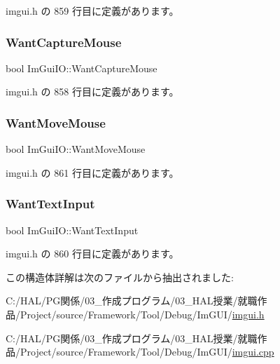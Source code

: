  imgui.\+h の 859 行目に定義があります。

\mbox{\label{struct_im_gui_i_o_af5b8add76c5d833a65df19b5456acd7e}} 
\subsubsection{\texorpdfstring{Want\+Capture\+Mouse}{WantCaptureMouse}}
{\footnotesize\ttfamily bool Im\+Gui\+I\+O\+::\+Want\+Capture\+Mouse}



 imgui.\+h の 858 行目に定義があります。

\mbox{\label{struct_im_gui_i_o_a0bd366ca18e78bf58f674a355189eaf3}} 
\subsubsection{\texorpdfstring{Want\+Move\+Mouse}{WantMoveMouse}}
{\footnotesize\ttfamily bool Im\+Gui\+I\+O\+::\+Want\+Move\+Mouse}



 imgui.\+h の 861 行目に定義があります。

\mbox{\label{struct_im_gui_i_o_a0e53197e96187a57b2d86720bf163f4d}} 
\subsubsection{\texorpdfstring{Want\+Text\+Input}{WantTextInput}}
{\footnotesize\ttfamily bool Im\+Gui\+I\+O\+::\+Want\+Text\+Input}



 imgui.\+h の 860 行目に定義があります。



この構造体詳解は次のファイルから抽出されました\+:\begin{DoxyCompactItemize}
\item 
C\+:/\+H\+A\+L/\+P\+G関係/03\+\_\+作成プログラム/03\+\_\+\+H\+A\+L授業/就職作品/\+Project/source/\+Framework/\+Tool/\+Debug/\+Im\+G\+U\+I/\mbox{\hyperlink{imgui_8h}{imgui.\+h}}\item 
C\+:/\+H\+A\+L/\+P\+G関係/03\+\_\+作成プログラム/03\+\_\+\+H\+A\+L授業/就職作品/\+Project/source/\+Framework/\+Tool/\+Debug/\+Im\+G\+U\+I/\mbox{\hyperlink{imgui_8cpp}{imgui.\+cpp}}\end{DoxyCompactItemize}
